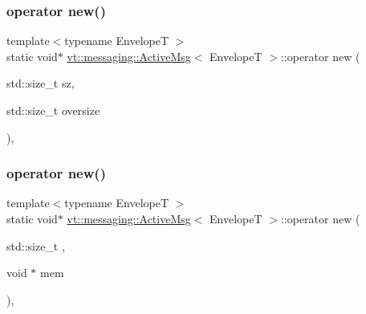 \mbox{\label{structvt_1_1messaging_1_1_active_msg_ac13140f75e5238670c81589a84881ac1}} 
\subsubsection{\texorpdfstring{operator new()}{operator new()}\hspace{0.1cm}{\footnotesize\ttfamily [2/3]}}
{\footnotesize\ttfamily template$<$typename EnvelopeT $>$ \\
static void$\ast$ \hyperlink{structvt_1_1messaging_1_1_active_msg}{vt\+::messaging\+::\+Active\+Msg}$<$ EnvelopeT $>$\+::operator new (\begin{DoxyParamCaption}\item[{std\+::size\+\_\+t}]{sz,  }\item[{std\+::size\+\_\+t}]{oversize }\end{DoxyParamCaption})\hspace{0.3cm}{\ttfamily [inline]}, {\ttfamily [static]}}

\mbox{\label{structvt_1_1messaging_1_1_active_msg_a03927a2881ef7e3308765361cb89c606}} 
\subsubsection{\texorpdfstring{operator new()}{operator new()}\hspace{0.1cm}{\footnotesize\ttfamily [3/3]}}
{\footnotesize\ttfamily template$<$typename EnvelopeT $>$ \\
static void$\ast$ \hyperlink{structvt_1_1messaging_1_1_active_msg}{vt\+::messaging\+::\+Active\+Msg}$<$ EnvelopeT $>$\+::operator new (\begin{DoxyParamCaption}\item[{std\+::size\+\_\+t}]{,  }\item[{void $\ast$}]{mem }\end{DoxyParamCaption})\hspace{0.3cm}{\ttfamily [inline]}, {\ttfamily [static]}}

